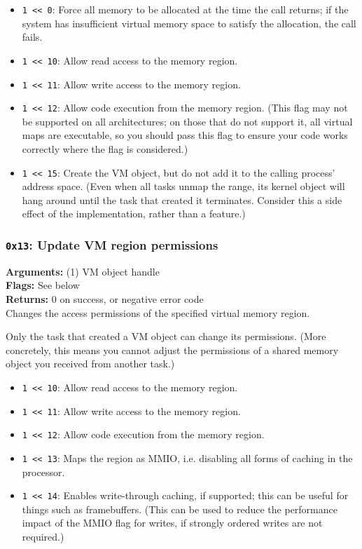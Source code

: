 \documentclass[11pt]{article}
\begin{document}
\begin{itemize}
\item \texttt{1 << 0}: Force all memory to be allocated at the time the call returns; if the system has insufficient virtual memory space to satisfy the allocation, the call fails.
\item \texttt{1 << 10}: Allow read access to the memory region.
\item \texttt{1 << 11}: Allow write access to the memory region.
\item \texttt{1 << 12}: Allow code execution from the memory region. (This flag may not be supported on all architectures; on those that do not support it, all virtual maps are executable, so you should pass this flag to ensure your code works correctly where the flag is considered.)
\item \texttt{1 << 15}: Create the VM object, but do not add it to the calling process' address space. (Even when all tasks unmap the range, its kernel object will hang around until the task that created it terminates. Consider this a side effect of the implementation, rather than a feature.)
\end{itemize}

\subsubsection{{\tt 0x13}: Update VM region permissions}
\textbf{Arguments:} (1) VM object handle \\
\textbf{Flags:} See below \\
\textbf{Returns:} 0 on success, or negative error code \\

Changes the access permissions of the specified virtual memory region.

Only the task that created a VM object can change its permissions. (More concretely, this means you cannot adjust the permissions of a shared memory object you received from another task.)

\begin{itemize}
\item \texttt{1 << 10}: Allow read access to the memory region.
\item \texttt{1 << 11}: Allow write access to the memory region.
\item \texttt{1 << 12}: Allow code execution from the memory region.
\item \texttt{1 << 13}: Maps the region as MMIO, i.e. disabling all forms of caching in the processor.
\item \texttt{1 << 14}: Enables write-through caching, if supported; this can be useful for things such as framebuffers. (This can be used to reduce the performance impact of the MMIO flag for writes, if strongly ordered writes are not required.)
\end{itemize}
\end{document}
